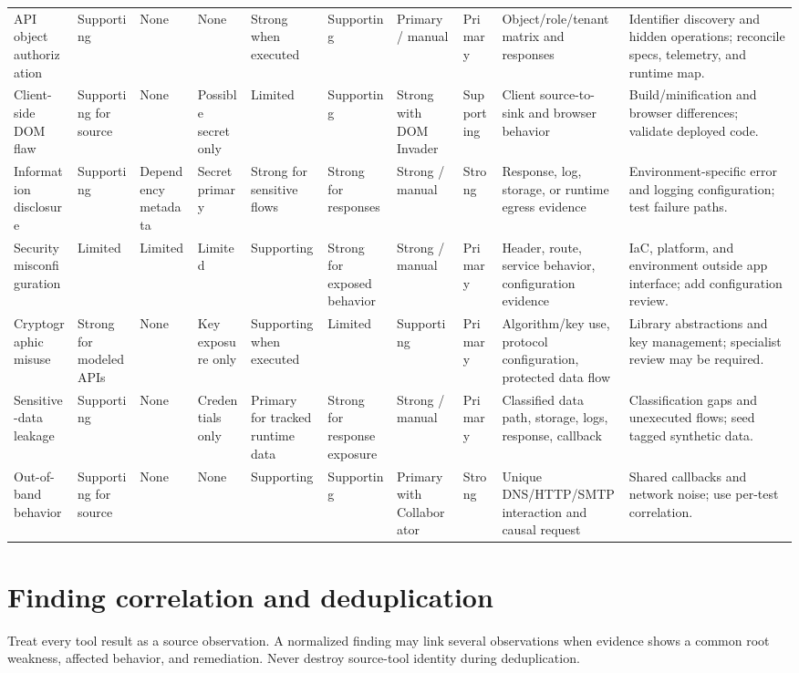 \documentclass[11pt,letterpaper]{article}
\begin{document}
\begin{landscape}
\begin{longtable}{@{}L{1.1in}L{0.65in}L{0.70in}L{0.65in}L{0.65in}L{0.72in}L{0.64in}L{0.75in}L{1.35in}L{1.72in}@{}}
API object authorization & Supporting & None & None & Strong when executed & Supporting & Primary / manual & Primary & Object/role/tenant matrix and responses & Identifier discovery and hidden operations; reconcile specs, telemetry, and runtime map. \\
Client-side DOM flaw & Supporting for source & None & Possible secret only & Limited & Supporting & Strong with DOM Invader & Supporting & Client source-to-sink and browser behavior & Build/minification and browser differences; validate deployed code. \\
Information disclosure & Supporting & Dependency metadata & Secret primary & Strong for sensitive flows & Strong for responses & Strong / manual & Strong & Response, log, storage, or runtime egress evidence & Environment-specific error and logging configuration; test failure paths. \\
Security misconfiguration & Limited & Limited & Limited & Supporting & Strong for exposed behavior & Strong / manual & Primary & Header, route, service behavior, configuration evidence & IaC, platform, and environment outside app interface; add configuration review. \\
Cryptographic misuse & Strong for modeled APIs & None & Key exposure only & Supporting when executed & Limited & Supporting & Primary & Algorithm/key use, protocol configuration, protected data flow & Library abstractions and key management; specialist review may be required. \\
Sensitive-data leakage & Supporting & None & Credentials only & Primary for tracked runtime data & Strong for response exposure & Strong / manual & Primary & Classified data path, storage, logs, response, callback & Classification gaps and unexecuted flows; seed tagged synthetic data. \\
Out-of-band behavior & Supporting for source & None & None & Supporting & Supporting & Primary with Collaborator & Strong & Unique DNS/HTTP/SMTP interaction and causal request & Shared callbacks and network noise; use per-test correlation. \\
\bottomrule
\end{longtable}
\end{landscape}

\section{Finding correlation and deduplication}

Treat every tool result as a source observation. A normalized finding may link several observations when evidence shows a common root weakness, affected behavior, and remediation. Never destroy source-tool identity during deduplication.
\end{document}
